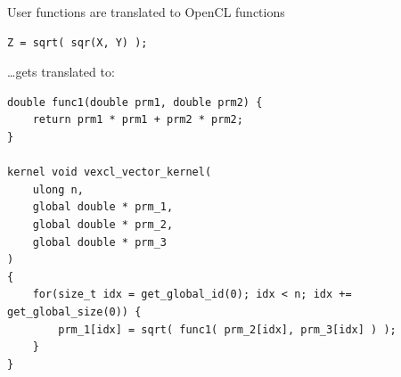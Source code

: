 \documentclass[@BEAMER_OPTIONS@]{beamer}
\begin{document}
\begin{frame}[fragile]{User functions are translated to OpenCL functions}
    \begin{exampleblock}{}
        \begin{lstlisting}
Z = sqrt( sqr(X, Y) );
        \end{lstlisting}
    \end{exampleblock}
    \begin{exampleblock}{\ldots gets translated to:}
        \begin{lstlisting}
double func1(double prm1, double prm2) {
    return prm1 * prm1 + prm2 * prm2;
}

kernel void vexcl_vector_kernel(
    ulong n,
    global double * prm_1,
    global double * prm_2,
    global double * prm_3
)
{
    for(size_t idx = get_global_id(0); idx < n; idx += get_global_size(0)) {
        prm_1[idx] = sqrt( func1( prm_2[idx], prm_3[idx] ) );
    }
}
        \end{lstlisting}
    \end{exampleblock}
\end{frame}

\note{ }
\end{document}
